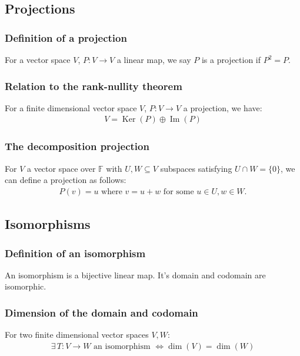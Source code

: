 \documentclass[a4paper, 12pt, twoside]{article}
\DeclareMathOperator{\Ker}{Ker}
\DeclareMathOperator{\Ima}{Im}
\begin{document}
\subsection{Projections}

\subsubsection{Definition of a projection}

For a vector space $V$, $P : V \to V$ a linear map, we say $P$
is a projection if $P^2 = P$.

\subsubsection{Relation to the rank-nullity theorem}

For a finite dimensional vector space $V$, $P : V \to V$ a projection,
we have:
\begin{align*}
  V = \Ker(P) \oplus \Ima(P)
\end{align*}

\subsubsection{The decomposition projection}

For $V$ a vector space over $\mathbb{F}$ with $U, W \subseteq V$
subspaces satisfying $U \cap W = \{0\}$, we can define a projection
as follows:
\begin{align*}
  P(v) = u \text{ where } v = u + w \text{ for some } u \in U, w \in W.
\end{align*}

\subsection{Isomorphisms}

\subsubsection{Definition of an isomorphism}

An isomorphism is a bijective linear map. It's domain and codomain
are isomorphic.

\subsubsection{Dimension of the domain and codomain}

For two finite dimensional vector spaces $V, W$:
\begin{gather*}
  \exists \, T : V \to W \text{ an isomorphism } \Leftrightarrow
  \dim(V) = \dim(W)
\end{gather*}
\end{document}
